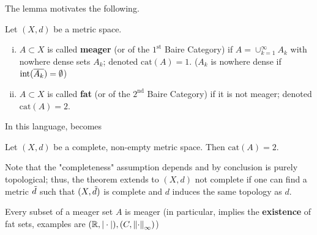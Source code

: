 \documentclass{article}
\begin{document}
\begin{flushleft}
The lemma motivates the following.  
\end{flushleft}


\begin{definition}  
    Let $(X,d)$ be a metric space.  
    \begin{enumerate}[i)]
    \item $A \subset X$ is called \textbf{meager} (or of the $1^{\textrm{st}}$ Baire Category) if $A = \cup_{k=1}^{\infty} A_k$ with nowhere dense sets $A_k$; denoted $\textrm{cat}(A)=1$. ($A_k$ is nowhere dense if $\textrm{int}(\overline{A_k})=\emptyset$)
    \item $A \subset X$ is called \textbf{fat} (or of the $2^{\textrm{nd}}$ Baire Category) if it is not meager; denoted $\textrm{cat}(A)=2$.  
\end{enumerate} 
\end{definition} 


In this language,  becomes  

\begin{theorem}
\nl
\label{baire category}
Let  $(X,d)$ be a complete, non-empty metric space. Then $\textrm{cat}(A)=2$.  
\end{theorem}  
Note that the "completeness" assumption depends and by conclusion is purely topological; thus, the theorem extends to $(X,d)$ not complete if one can find a metric $\Tilde{d}$ such that $(X, \Tilde{d})$ is complete and $d$ induces the same topology as $d$.

\begin{remark}
    Every subset of a meager set $A$ is meager (in particular,  implies the \textbf{existence} of fat sets, examples are $(\mathbb{R}, |\cdot|), (C, \left\|{\cdot}\right\|_{\infty})$)
\end{remark}
\end{document}
